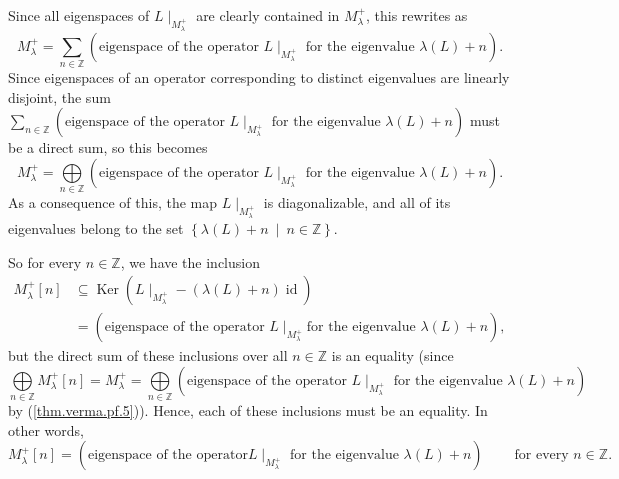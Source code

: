 \documentclass[etingof-lie.tex]{subfiles}
\begin{document}
Since all eigenspaces of $L\mid_{M_{\lambda}^{+}}$ are clearly contained in
$M_{\lambda}^{+}$, this rewrites as%
\[
M_{\lambda}^{+}=\sum\limits_{n\in\mathbb{Z}}\left(  \text{eigenspace of the
operator }L\mid_{M_{\lambda}^{+}}\text{ for the eigenvalue }\lambda\left(
L\right)  +n\right)  .
\]
Since eigenspaces of an operator corresponding to distinct eigenvalues are
linearly disjoint, the sum $\sum\limits_{n\in\mathbb{Z}}\left(
\text{eigenspace of the operator }L\mid_{M_{\lambda}^{+}}\text{ for the
eigenvalue }\lambda\left(  L\right)  +n\right)  $ must be a direct sum, so
this becomes%
\begin{equation}
M_{\lambda}^{+}=\bigoplus\limits_{n\in\mathbb{Z}}\left(  \text{eigenspace of
the operator }L\mid_{M_{\lambda}^{+}}\text{ for the eigenvalue }\lambda\left(
L\right)  +n\right)  . \label{thm.verma.pf.5}%
\end{equation}
As a consequence of this, the map $L\mid_{M_{\lambda}^{+}}$ is diagonalizable,
and all of its eigenvalues belong to the set $\left\{  \lambda\left(
L\right)  +n\ \mid\ n\in\mathbb{Z}\right\}  $.

So for every $n\in\mathbb{Z}$, we have the inclusion%
\begin{align*}
M_{\lambda}^{+}\left[  n\right]   &  \subseteq\operatorname*{Ker}\left(
L\mid_{M_{\lambda}^{+}}-\left(  \lambda\left(  L\right)  +n\right)
\operatorname*{id}\right) \\
&  =\left(  \text{eigenspace of the operator }L\mid_{M_{\lambda}^{+}}\text{
for the eigenvalue }\lambda\left(  L\right)  +n\right)  ,
\end{align*}
but the direct sum of these inclusions over all $n\in\mathbb{Z}$ is an
equality (since%
\[
\bigoplus\limits_{n\in\mathbb{Z}}M_{\lambda}^{+}\left[  n\right]  =M_{\lambda
}^{+}=\bigoplus\limits_{n\in\mathbb{Z}}\left(  \text{eigenspace of the
operator }L\mid_{M_{\lambda}^{+}}\text{ for the eigenvalue }\lambda\left(
L\right)  +n\right)
\]
by (\ref{thm.verma.pf.5})). Hence, each of these inclusions must be an
equality. In other words,
\begin{equation}
M_{\lambda}^{+}\left[  n\right]  =\left(  \text{eigenspace of the operator
}L\mid_{M_{\lambda}^{+}}\text{ for the eigenvalue }\lambda\left(  L\right)
+n\right)  \ \ \ \ \ \ \ \ \ \ \text{for every }n\in\mathbb{Z}.
\label{thm.verma.pf.6}%
\end{equation}
\end{document}
